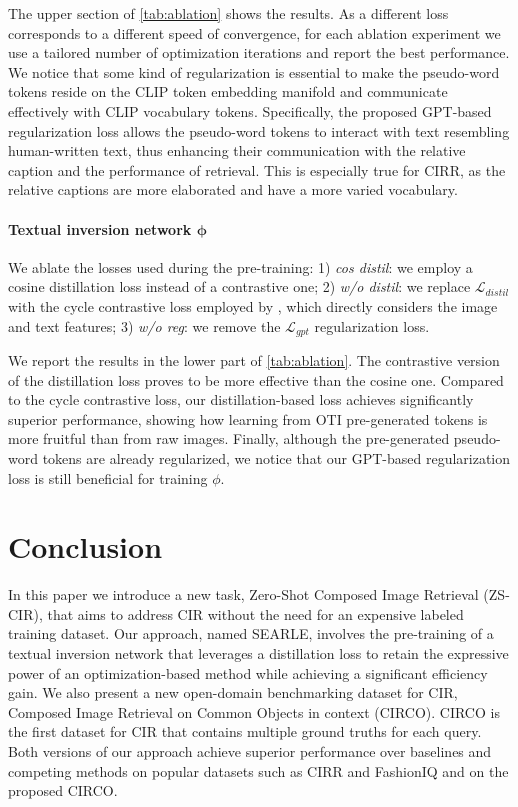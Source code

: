 \documentclass[10pt,twocolumn,letterpaper]{article}
\newcommand{\method}{SEARLE\xspace}
\DeclareRobustCommand{\vect}[1]{\bm{#1}}
\begin{document}
The upper section of \cref{tab:ablation} shows the results. As a different loss corresponds to a different speed of convergence, for each ablation experiment we use a tailored number of optimization iterations and report the best performance. 
We notice that some kind of regularization is essential to make the pseudo-word tokens reside on the CLIP token embedding manifold and communicate effectively with CLIP vocabulary tokens. Specifically, the proposed GPT-based regularization loss allows the pseudo-word tokens to interact with text resembling human-written text, thus enhancing their communication with the relative caption and the performance of retrieval. This is especially true for CIRR, as the relative captions are more elaborated and have a more varied vocabulary.

\paragraph{Textual inversion network $\vect{\phi}$} \label{sec:ablation_phi}
We ablate the losses used during the pre-training: 1) \textit{cos distil}: we employ a cosine distillation loss instead of a contrastive one;  2) \textit{w/o distil}: we replace $\mathcal{L}_{distil}$ with the cycle contrastive loss employed by \cite{cohen2022this}, which directly considers the image and text features; 3) \textit{w/o reg}: we remove the $\mathcal{L}_{gpt}$ regularization loss.

We report the results in the lower part of \cref{tab:ablation}. The contrastive version of the distillation loss proves to be more effective than the cosine one. Compared to the cycle contrastive loss, our distillation-based loss achieves significantly superior performance, showing how learning from OTI pre-generated tokens is more fruitful than from raw images. Finally, although the pre-generated pseudo-word tokens are already regularized, we notice that our GPT-based regularization loss is still beneficial for training $\phi$.



\section{Conclusion}
In this paper we introduce a new task, Zero-Shot Composed Image Retrieval (ZS-CIR), that aims to address CIR without the need for an expensive labeled training dataset. Our approach, named \method, involves the pre-training of a textual inversion network that leverages a distillation loss to retain the expressive power of an optimization-based method while achieving a significant efficiency gain. We also present a new open-domain benchmarking dataset for CIR, Composed Image Retrieval on Common Objects in context (CIRCO). CIRCO is the first dataset for CIR that contains multiple ground truths for each query. Both versions of our approach achieve superior performance over baselines and competing methods on popular datasets such as CIRR and FashionIQ and on the proposed CIRCO.
\end{document}
